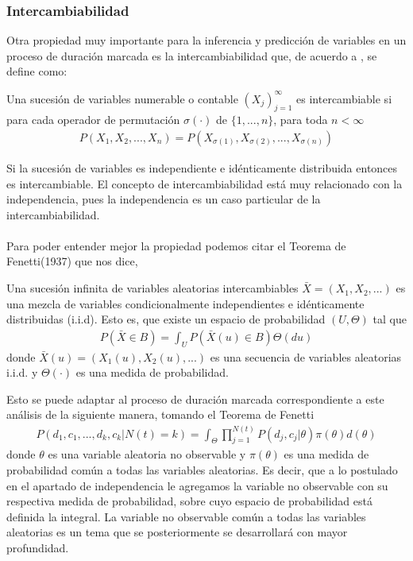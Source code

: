 \subsubsection{Intercambiabilidad}
Otra propiedad muy importante para la inferencia y predicci\'on de variables en un proceso de duraci\'on marcada es la intercambiabilidad que, de acuerdo a \cite{hahn2012exchangeable}, se define como:
\begin{defi}
Una sucesi\'on de variables numerable o contable $(X_j)_{j=1}^{\infty}$ es intercambiable si para cada operador de permutaci\'on $\sigma(\cdot)$ de $\{1,...,n\}$, para toda $n<\infty$ 
\begin{align}
P(X_1,X_2,...,X_n)=P(X_{\sigma(1)},X_{\sigma(2)},...,X_{\sigma(n)}) \nonumber
\end{align}
\end{defi}
Si la sucesi\'on de variables es independiente e id\'enticamente distribuida entonces es intercambiable. El concepto de intercambiabilidad est\'a muy relacionado con la independencia, pues la independencia es un caso particular de la intercambiabilidad.\\
\\
Para poder entender mejor la propiedad podemos citar el Teorema de Fenetti(1937) que nos dice,
\begin{teo}
Una sucesi\'on infinita de variables aleatorias intercambiables $\bar{X}=(X_1,X_2,...)$ es una mezcla de variables condicionalmente independientes e id\'enticamente distribuidas (i.i.d). Esto es, que existe un espacio de probabilidad $(U,\Theta)$ tal que
\begin{align}
P(\bar{X} \in B)=\int_U P(\bar{X}(u) \in B) \Theta(du)   \nonumber
\end{align}
donde $\bar{X}(u)=(X_1(u),X_2(u),...)$ es una secuencia de variables aleatorias i.i.d. y $\Theta(\cdot)$ es una medida de probabilidad.
\end{teo}
Esto se puede adaptar al proceso de duraci\'on marcada correspondiente a este an\'alisis de la siguiente manera, tomando el Teorema de Fenetti
\begin{align*}
P(d_1,c_1,...,d_k,c_k|N(t)=k)=\int_\Theta \prod_{j=1}^{N(t)} P(d_j,c_j|\theta) \pi(\theta) d(\theta)
\end{align*}
donde $\theta$ es una variable aleatoria no observable y $\pi(\theta)$ es una medida de probabilidad com\'un a todas las variables aleatorias. Es decir, que a lo postulado en el apartado de independencia le agregamos la variable no observable con su respectiva medida de probabilidad, sobre cuyo espacio de probabilidad est\'a definida la integral. La variable no observable com\'un a todas las variables aleatorias es un tema que se posteriormente se desarrollar\'a con mayor profundidad.
